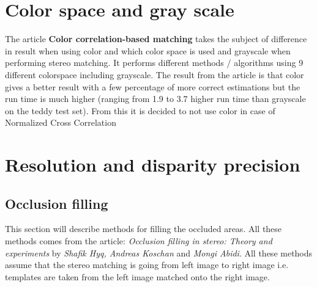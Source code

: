 

\section{Color space and gray scale}
The article \textbf{Color correlation-based matching} takes the subject of difference in result when using color and which color space is used and grayscale when performing stereo matching. It performs different methods / algorithms using 9 different colorspace including grayscale. The result from the article is that color gives a better result with a few percentage of more correct estimations but the run time is much higher (ranging from 1.9 to 3.7 higher run time than grayscale on the teddy test set).
From this it is decided to not use color in case of Normalized Cross Correlation

\section{Resolution and disparity precision}

\subsection{Occlusion filling}
This section will describe methods for filling the occluded areas. All these methods comes from the article: \textit{Occlusion filling in stereo: Theory and experiments} by \textit{Shafik Hyq, Andreas Koschan} and \textit{Mongi Abidi}. All these methods assume that the stereo matching is going from left image to right image i.e. templates are taken from the left image matched onto the right image.
 

